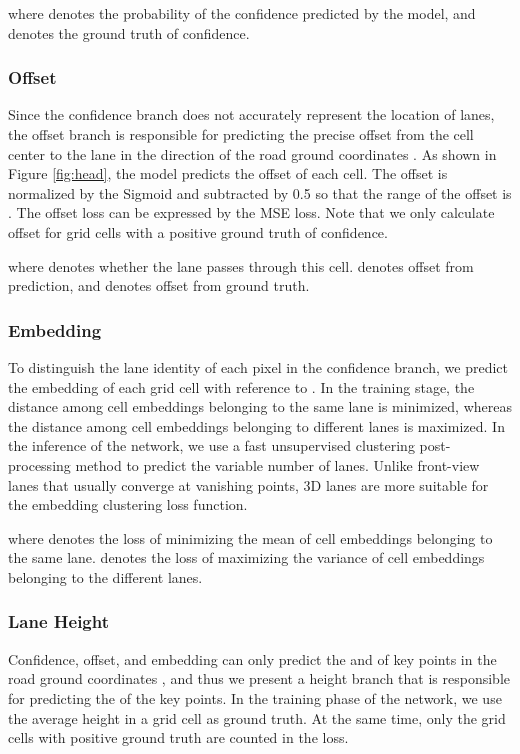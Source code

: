 \documentclass[10pt,twocolumn,letterpaper]{article}
\begin{document}
where  denotes the probability of the confidence predicted by the model, and  denotes the ground truth of confidence.

\subsubsection{Offset}
Since the confidence branch does not accurately represent the location of lanes, the offset branch is responsible for predicting the precise offset from the cell center to the lane in the  direction of the road ground coordinates . As shown in Figure \ref{fig:head}, the model predicts the offset  of each cell. The offset is normalized by the Sigmoid and subtracted by 0.5 so that the range of the offset is . The offset loss can be expressed by the MSE loss. Note that we only calculate offset for grid cells with a positive ground truth of confidence.

where  denotes whether the lane passes through this cell.  denotes offset from prediction, and  denotes offset from ground truth.

\subsubsection{Embedding}
To distinguish the lane identity of each pixel in the confidence branch, we predict the embedding of each grid cell with reference to \cite{de2017semantic, neven2018towards}. In the training stage, the distance among cell embeddings belonging to the same lane is minimized, whereas the distance among cell embeddings belonging to different lanes is maximized. In the inference of the network, we use a fast unsupervised clustering post-processing method to predict the variable number of lanes. Unlike front-view lanes that usually converge at vanishing points, 3D lanes are more suitable for the embedding clustering loss function.

where  denotes the loss of minimizing the mean of cell embeddings belonging to the same lane.  denotes the loss of maximizing the variance of cell embeddings belonging to the different lanes.
\subsubsection{Lane Height}
Confidence, offset, and embedding can only predict the  and  of key points in the road ground coordinates , and thus we present a height branch that is responsible for predicting the  of the key points. In the training phase of the network, we use the average height in a grid cell as ground truth. At the same time, only the grid cells with positive ground truth are counted in the loss.
\end{document}
